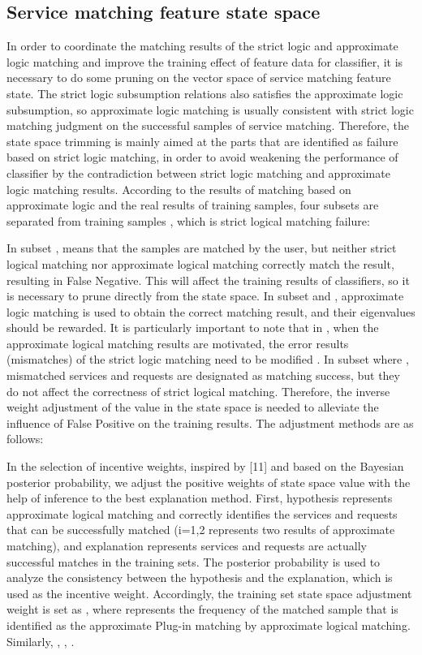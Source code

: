 \documentclass{ieeeaccess}
\begin{document}
\subsection{Service matching feature state space}

In order to coordinate the matching results of the strict logic and approximate logic matching and improve the training effect of feature data for classifier, it is necessary to do some pruning on the vector space of service matching feature state. The strict logic subsumption relations also satisfies the approximate logic subsumption, so approximate logic matching is usually consistent with strict logic matching judgment on the successful samples of service matching. Therefore, the state space trimming is mainly aimed at the parts that are identified as failure based on strict logic matching, in order to avoid weakening the performance of classifier by the contradiction between strict logic matching and approximate logic matching results. According to the results of matching based on approximate logic and the real results of training samples, four subsets are separated from training samples  , which is strict logical matching failure:
 

In subset  ,  means that the samples are matched by the user, but neither strict logical matching nor approximate logical matching correctly match the result, resulting in False Negative. This will affect the training results of classifiers, so it is necessary to prune   directly from the state space. In subset   and  , approximate logic matching is used to obtain the correct matching result, and their eigenvalues should be rewarded. It is particularly important to note that in  , when the approximate logical matching results are motivated, the error results (mismatches) of the strict logic matching need to be modified  . In subset   where  , mismatched services and requests are designated as matching success, but they do not affect the correctness of strict logical matching. Therefore, the inverse weight adjustment of the value in the state space is needed to alleviate the influence of False Positive on the training results. The adjustment methods are as follows:

In the selection of incentive weights, inspired by [11] and based on the Bayesian posterior probability, we adjust the positive weights of state space value with the help of inference to the best explanation method. First, hypothesis   represents approximate logical matching and correctly identifies the services and requests that can be successfully matched (i=1,2 represents two results of approximate matching), and explanation   represents services and requests are actually successful matches in the training sets. The posterior probability is used to analyze the consistency between the hypothesis and the explanation, which is used as the incentive weight. Accordingly, the training set state space adjustment weight is set as  , where   represents the frequency of the matched sample that is identified as the approximate Plug-in matching by approximate logical matching. Similarly,  ,  ,  .
\end{document}
